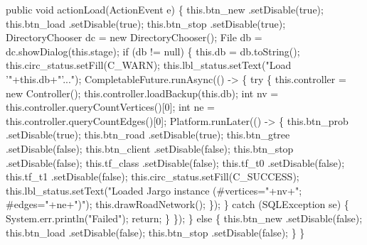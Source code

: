 \nwenddocs{}\endmoddef{}
public void actionLoad(ActionEvent e) \{
  this.btn_new      .setDisable(true);
  this.btn_load     .setDisable(true);
  this.btn_stop     .setDisable(true);
  DirectoryChooser dc = new DirectoryChooser();
  File db = dc.showDialog(this.stage);
  if (db != null) \{
    this.db = db.toString();
    this.circ_status.setFill(C_WARN);
    this.lbl_status.setText("Load '"+this.db+"'...");
    CompletableFuture.runAsync(() -> \{
      try \{
        this.controller = new Controller();
        this.controller.loadBackup(this.db);
        int nv = this.controller.queryCountVertices()[0];
        int ne = this.controller.queryCountEdges()[0];
        Platform.runLater(() -> \{
          this.btn_prob     .setDisable(true);
          this.btn_road     .setDisable(true);
          this.btn_gtree    .setDisable(false);
          this.btn_client   .setDisable(false);
          this.btn_stop     .setDisable(false);
          this.tf_class     .setDisable(false);
          this.tf_t0        .setDisable(false);
          this.tf_t1        .setDisable(false);
          this.circ_status.setFill(C_SUCCESS);
          this.lbl_status.setText("Loaded Jargo instance (#vertices="+nv+"; #edges="+ne+")");
          this.drawRoadNetwork();
        \});
      \} catch (SQLException se) \{
        System.err.println("Failed");
        return;
      \}
    \});
  \} else \{
    this.btn_new      .setDisable(false);
    this.btn_load     .setDisable(false);
    this.btn_stop     .setDisable(false);
  \}
\}
\nwendcode{}\nwdocspar


